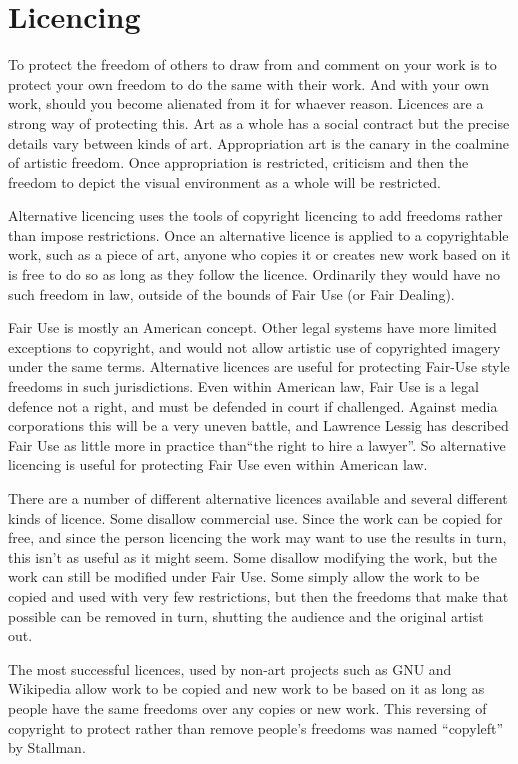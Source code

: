 \documentclass[11pt, a4]{article}
\let\footnote=\endnote
\begin{document}
\section{Licencing}

To protect the freedom of others to draw from and comment on your work is to protect your own freedom to do the same with their work. And with your own work, should you become alienated from it for whaever reason. Licences are a strong way of protecting this. Art as a whole has a social contract but the precise details vary between kinds of art. Appropriation art is the canary in the coalmine of artistic freedom. Once appropriation is restricted, criticism and then the freedom to depict the visual environment as a whole will be restricted.

Alternative licencing uses the tools of copyright licencing to add freedoms rather than impose restrictions. Once an alternative licence is applied to a copyrightable work, such as a piece of art, anyone who copies it or creates new work based on it is free to do so as long as they follow the licence. Ordinarily they would have no such freedom in law, outside of the bounds of Fair Use (or Fair Dealing).

Fair Use is mostly an American concept. Other legal systems have more limited exceptions to copyright, and would not allow artistic use of copyrighted imagery under the same terms. Alternative licences are useful for protecting Fair-Use style freedoms in such jurisdictions. Even within American law, Fair Use is a legal defence not a right, and must be defended in court if challenged. Against media corporations this will be a very uneven battle, and Lawrence Lessig has described Fair Use as little more in practice than``the right to hire a lawyer''\footnote{ Lessig, ibid.}. So alternative licencing is useful for protecting Fair Use even within American law.

There are a number of different alternative licences available and several different kinds of licence. Some disallow commercial use. Since the work can be copied for free, and since the person licencing the work may want to use the results in turn, this isn't as useful as it might seem. Some disallow modifying the work, but the work can still be modified under Fair Use. Some simply allow the work to be copied and used with very few restrictions, but then the freedoms that make that possible can be removed in turn, shutting the audience and the original artist out.

The most successful licences, used by non-art projects such as GNU \footnote{ See: \url{http://www.gnu.org/}} and Wikipedia \footnote{ See: \url{http://wikipedia.org/}} allow work to be copied and new work to be based on it as long as people have the same freedoms over any copies or new work. This reversing of copyright to protect rather than remove people's freedoms was named ``copyleft'' by Stallman. 
\end{document}
